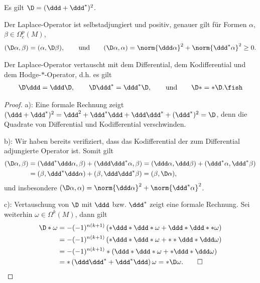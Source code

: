 \documentclass[%
	paper=a5,%
	fleqn,%
	DIV=18,%
	BCOR=0mm,
	fontsize=11pt,
	titlepage=false,%
	bibliography=totoc,
	DIV=18,%
	twoside=true,
	pdftitle=Riemannsche Geometrie,
	pdfauthor=Uwe Semmelmann,
	numbers=noendperiod]%
	{scrbook}
\begin{document}
\begin{lem}
\begin{propenum}
\item Es gilt $\D = (\ddd + \ddd^*)^2$.
\item Der Laplace-Operator ist selbstadjungiert und positiv, genauer gilt für Formen $\alpha$, $\beta\in \Omega^p_{c}(M)$,
\begin{align*}
(\D \alpha,\beta) = (\alpha,\D\beta),\qquad \text{und} \qquad (\D\alpha,\alpha) = \norm{\ddd\alpha}^2 + \norm{\ddd^*\alpha}^2 \ge 0.
\end{align*}
\item Der Laplace-Operator vertauscht mit dem Differential, dem Kodifferential und dem Hodge-$*$-Operator, d.h. es gilt
\begin{align*}
\D\ddd = \ddd\D,\qquad \D\ddd^* = \ddd^* \D,\qquad\text{und}\qquad \D* = *\D. \fish
\end{align*}
\end{propenum}
\end{lem}
\begin{proof}
a): Eine formale Rechnung zeigt $(\ddd + \ddd^*)^2 = \ddd^2+ \ddd^*\ddd + \ddd\ddd^*  + (\ddd^*)^2=\D$, denn die Quadrate von Differential und Kodifferential verschwinden.

b): Wir haben bereits verifiziert, dass das Kodifferential der zum Differential adjungierte Operator ist. Somit gilt
\begin{align*}
(\D\alpha,\beta)  &=(\ddd^*\ddd\alpha,\beta) + 
(\ddd\ddd^*\alpha,\beta) = 
(\ddd \alpha,\ddd\beta) + (\ddd^*\alpha,\ddd^*\beta) \\ &= 
(\beta,\ddd^*\ddd\alpha) + (\beta,\ddd\ddd^*\beta) = 
(\beta,\D\alpha),
\end{align*}
und insbesondere $(\D\alpha,\alpha) = \norm{\ddd\alpha}^2 + \norm{\ddd^*\alpha}^2$.

c): Vertauschung von $\D$ mit $\ddd$ bzw. $\ddd^*$ zeigt eine formale Rechnung. Sei weiterhin $\omega\in\Omega^k(M)$, dann gilt
\begin{align*}
\D*\omega &= -(-1)^{n(k+1)}\left(*\ddd*\ddd*\omega + 
\ddd*\ddd**\omega\right)\\
&= -(-1)^{n(k+1)}\left(*\ddd*\ddd*\omega + 
**\ddd*\ddd\omega\right)\\
&= -(-1)^{n(k+1)}*\left(\ddd * \ddd*\omega + *\ddd  *\ddd \omega\right)\\
&=*\left(\ddd\ddd^* + \ddd^*\ddd\right)\omega = 
*\D\omega.\qed
\end{align*}
\end{proof}
\end{document}
